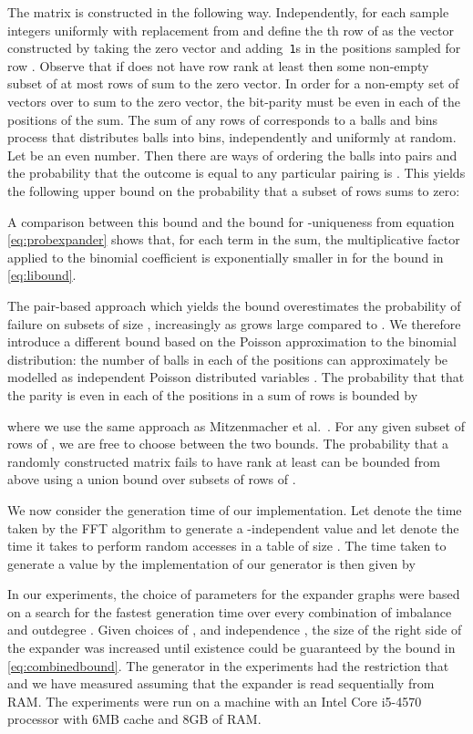 \documentclass[a4paper,11pt]{article}
\theoremstyle{plain}
\theoremstyle{definition}
\begin{document}
The matrix  is constructed in the following way.
Independently, for each  sample  integers uniformly with replacement from  and define the th row of  as the vector constructed by taking the zero vector and adding~\texttt{1}s in the  positions sampled for row .
Observe that if  does not have row rank at least  then some non-empty subset of at most  rows of  sum to the zero vector.
In order for a non-empty set of vectors over  to sum to the zero vector, the bit-parity must be even in each of the  positions of the sum. 
The sum of any  rows of  corresponds to a balls and bins process that distributes  balls into  bins, independently and uniformly at random.
Let  be an even number. Then there are  ways of ordering the balls into pairs and the probability that the outcome is equal to any particular pairing is . 
This yields the following upper bound on the probability that a subset of  rows sums to zero: 

A comparison between this bound and the bound for -uniqueness from equation \eqref{eq:probexpander} shows that, for each term in the sum, 
the multiplicative factor applied to the binomial coefficient  is exponentially smaller in  for the bound in \eqref{eq:libound}.

The pair-based approach which yields the bound  overestimates the probability of failure on subsets of size , increasingly as  grows large compared to . 
We therefore introduce a different bound based on the Poisson approximation to the binomial distribution: 
the number of balls in each of the  positions can approximately be modelled as independent Poisson distributed variables \cite[Ch. 5.4]{mitzenmacher2005}. 
The probability that that the parity is even in each of the  positions in a sum of  rows is bounded by

where we use the same approach as Mitzenmacher et al.~\cite{mitzenmacher2014}.
For any given subset of rows of , we are free to choose between the two bounds. 
The probability that a randomly constructed matrix  fails to have rank at least  can be bounded from above using a union bound over subsets of rows of .


We now consider the generation time of our implementation. 
Let  denote the time taken by the FFT algorithm to generate a -independent value and let  denote the time it takes to perform  random accesses in a table of size .  
The time taken to generate a value by the implementation of our generator is then given by

In our experiments, the choice of parameters for the expander graphs were based on a search for the fastest generation time over every combination of imbalance  and outdegree .
Given choices of ,  and independence , the size of the right side of the expander  was increased until existence could be guaranteed by the bound in \eqref{eq:combinedbound}.
The generator in the experiments had the restriction that  and we have measured  assuming that
the expander is read sequentially from RAM. 
The experiments were run on a machine with an Intel Core i5-4570 processor with 6MB cache and 8GB of RAM.
\end{document}
